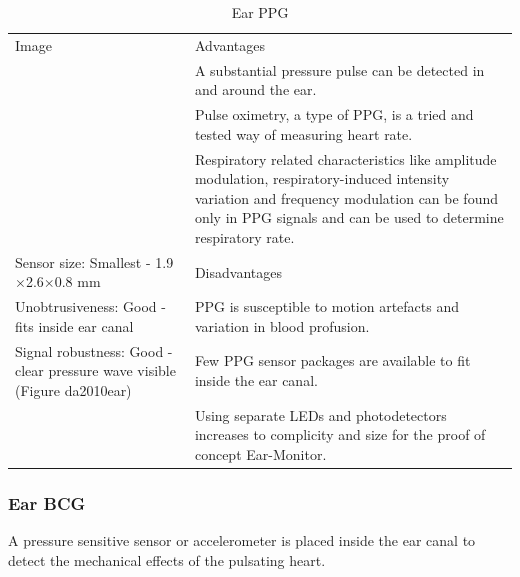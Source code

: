 \begin{table}[H]
\caption{Ear PPG}
\label{tab:EarPPG_Eval}
\renewcommand{\arraystretch}{1.3}	%
\centering
\begin{tabular}{|p{5cm}|p{8cm}|} 
 \hline
 Image 		& 	Advantages  \\ 
  			&	\tabitem A substantial pressure pulse can be detected in and around the ear.\\
  			&	\tabitem Pulse oximetry, a type of PPG, is a tried and tested way of measuring heart rate.\\
  			&	\tabitem Respiratory related characteristics like amplitude modulation, respiratory-induced intensity variation and frequency modulation can be found only in PPG signals and can be used to determine respiratory rate.\\
\hline
Sensor size: Smallest - 1.9$\times$2.6$\times$0.8 mm		&	Disadvantages  \\ 
Unobtrusiveness: Good - fits inside ear canal 				&	\tabitem PPG is susceptible to motion artefacts and variation in blood profusion.\\
Signal robustness: Good - clear pressure wave visible (Figure da2010ear) 						&	\tabitem Few PPG sensor packages are available to fit inside the ear canal.\\
  															&	\tabitem Using separate LEDs and photodetectors increases to complicity and size for the proof of concept Ear-Monitor.\\
 
 \hline
\end{tabular}
\end{table}

\subsubsection{Ear BCG}
A pressure sensitive sensor or accelerometer is placed inside the ear canal to detect the mechanical effects of the pulsating heart.

